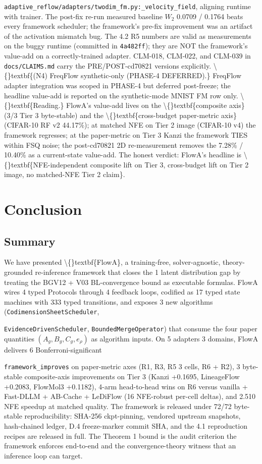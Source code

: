 \documentclass[preprint,3p,times,twocolumn]{elsarticle}
\begin{document}
\texttt{adaptive\_reflow/adapters/twodim\_fm.py:\_velocity\_field}, aligning runtime with trainer. The post-fix re-run measured baseline $W_2$ 0.0709 / 0.1764 beats every framework scheduler; the framework's pre-fix improvement was an artifact of the activation mismatch bug. The 4.2 R5 numbers are valid as measurements on the buggy runtime (committed in \texttt{4a482ff}); they are NOT the framework's value-add on a correctly-trained adapter. CLM-018, CLM-022, and CLM-039 in \texttt{docs/CLAIMS.md} carry the PRE/POST-cd70821 versions explicitly. \textbackslash\{\}textbf\{(N4) FreqFlow synthetic-only (PHASE-4 DEFERRED).\} FreqFlow adapter integration was scoped in PHASE-4 but deferred post-freeze; the headline value-add is reported on the synthetic-mode MNIST FM row only. \textbackslash\{\}textbf\{Reading.\} FlowA's value-add lives on the \textbackslash\{\}textbf\{composite axis\} (3/3 Tier 3 byte-stable) and the \textbackslash\{\}textbf\{cross-budget paper-metric axis\} (CIFAR-10 RF v2 44.17\%); at matched NFE on Tier 2 image (CIFAR-10 v4) the framework regresses; at the paper-metric on Tier 3 Kanzi the framework TIES within FSQ noise; the post-cd70821 2D re-measurement removes the 7.28\% / 10.40\% as a current-state value-add. The honest verdict: FlowA's headline is \textbackslash\{\}textbf\{NFE-independent composite lift on Tier 3, cross-budget lift on Tier 2 image, no matched-NFE Tier 2 claim\}.

\section{Conclusion}
\subsection{Summary}
We have presented \textbackslash\{\}textbf\{FlowA\}, a training-free, solver-agnostic, theory-grounded re-inference framework that closes the 1 latent distribution gap by treating the BGV12 + V03 BL-convergence bound as executable formulas. FlowA wires 4 typed Protocols through 4 feedback loops, codified as 17 typed state machines with 333 typed transitions, and exposes 3 new algorithms (\texttt{CodimensionSheetScheduler},

\texttt{EvidenceDrivenScheduler}, \texttt{BoundedMergeOperator}) that consume the four paper quantities $(A_g, B_g, C_g, e_\rho)$ as algorithm inputs. On 5 adapters  3 domains, FlowA delivers 6 Bonferroni-significant

\texttt{framework\_improves} on paper-metric axes (R1, R3, R5  3 cells, R6 + R2), 3 byte-stable composite-axis improvements on Tier 3 (Kanzi +0.1695, LineageFlow +0.2083, FlowMol3 +0.1182), 4-arm head-to-head wins on R6 versus vanilla + Fast-DLLM + AB-Cache + LeDiFlow (16 NFE-robust per-cell deltas), and 2.510 NFE speedup at matched quality. The framework is released under 72/72 byte-stable reproducibility: SHA-256 ckpt-pinning, vendored upstream snapshots, hash-chained ledger, D.4 freeze-marker commit SHA, and the 4.1 reproduction recipes are released in full. The Theorem 1 bound is the audit criterion the framework enforces end-to-end and the convergence-theory witness that an inference loop can target.
\end{document}
